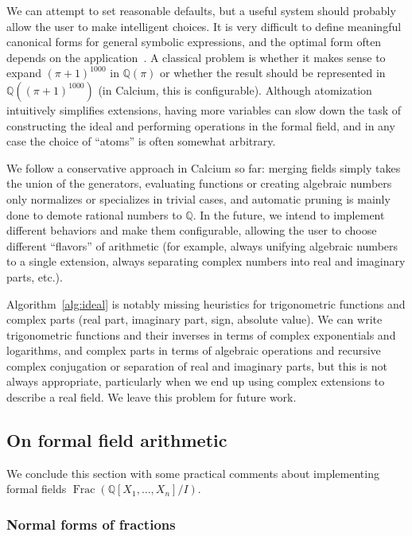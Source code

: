 \documentclass[11pt,a4paper]{article}
\begin{document}
We can attempt to set reasonable defaults, but a useful system
should probably allow the user to make intelligent choices.
It is very difficult to define meaningful canonical forms for general
symbolic expressions, and the optimal
form often depends on the application~\cite{Mos1971,Car2004}.
A classical problem is whether it makes sense to expand $(\pi+1)^{1000}$ in $\mathbb{Q}(\pi)$
or whether the result should be represented in $\mathbb{Q}((\pi+1)^{1000})$
(in Calcium, this is configurable).
Although atomization intuitively simplifies extensions,
having more variables
can slow down the task of constructing
the ideal and performing operations in the formal field,
and in any case the choice of ``atoms'' is often somewhat arbitrary.

We follow a conservative approach in Calcium so far: merging fields simply
takes the union of the generators,
evaluating functions or creating algebraic numbers
only normalizes or specializes in trivial cases,
and automatic pruning is mainly done to demote rational numbers
to $\mathbb{Q}$. In the future, we intend to implement different
behaviors and make them configurable, allowing the user to choose different
``flavors'' of arithmetic (for example, always unifying algebraic numbers to
a single extension, always separating complex numbers into
real and imaginary parts, etc.).

Algorithm~\ref{alg:ideal} 
is notably missing heuristics for
trigonometric functions
and complex parts (real part, imaginary part, sign,
absolute value).
We can write trigonometric functions and their inverses
in terms of complex exponentials and logarithms,
and complex parts in terms of algebraic operations
and recursive complex conjugation or separation of real
and imaginary parts,
but this is not always appropriate, particularly when we end up using
complex extensions to describe a real field.
We leave this problem for future work.

\subsection{On formal field arithmetic}

We conclude this section with
some practical comments
about implementing formal fields
$\operatorname{Frac}(\mathbb{Q}[X_1,\ldots,X_n] / I)$.

\subsubsection{Normal forms of fractions}
\end{document}
